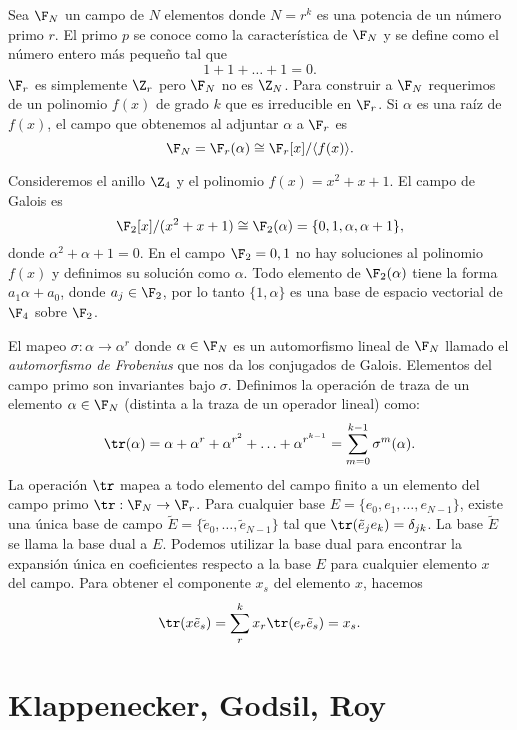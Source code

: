   Sea $\F_N$ un campo de $N$ elementos donde $N = r^{k}$ es
  una potencia de un número primo $r$. El primo $p$ se
  conoce como la característica de $\F_N$ y se define como
  el número entero más pequeño tal que
  \[
    1 + 1 + \ldots + 1 = 0.
  \] 
  $\F_r$ es simplemente $\Z_r$ pero $\F_N$ no es $\Z_N$.
  Para construir a $\F_N$ requerimos de un polinomio $f(x)$ 
  de grado $k$ que es irreducible en $\F_r$. Si $\alpha$ es
  una raíz de $f(x)$, el campo que obtenemos al adjuntar
  $\alpha$ a $\F_r$ es
  \[
    \F_N
    = \F_r(\alpha) \cong \F_r[x] / \langle f(x) \rangle.
  \] 
  \begin{example}
    Consideremos el anillo $\Z_4$ y el polinomio $f(x) = x^2
    + x + 1$. El campo de Galois es
    \[
      \F_2[x] / (x^2 + x + 1)
      \cong \F_2(\alpha)
      = \{0, 1, \alpha, \alpha + 1\},
    \] 
    donde $\alpha^2 + \alpha + 1 = 0$. En el campo $\F_2 =
    {0,1}$ no hay soluciones al polinomio $f(x)$ y definimos
    su solución como $\alpha$. Todo elemento de
    $\F_2(\alpha)$ tiene la forma $a_1 \alpha + a_0$, donde
    $a_j \in \F_2$, por lo tanto $\{1, \alpha\}$ es una base
    de espacio vectorial de $\F_4$ sobre $\F_2$.
  \end{example}

  El mapeo $\sigma : \alpha \to \alpha^r$ donde $\alpha \in
  \F_N$ es un automorfismo lineal de $\F_N$ llamado el
  \textit{automorfismo de Frobenius} que nos da los
  conjugados de Galois. Elementos del campo primo son
  invariantes bajo $\sigma$. Definimos la operación de traza
  de un elemento $\alpha \in \F_N$ (distinta a la traza de
  un operador lineal) como:
  \[
    \tr(\alpha) 
    = \alpha + \alpha^{r} + \alpha^{r^2} + \ldots +
    \alpha^{r^{k-1}}
    = \sum_{m=0}^{k-1} \sigma^{m}(\alpha).
  \] 
  La operación $\tr$ mapea a todo elemento del campo finito
  a un elemento del campo primo $\tr : \F_N \to \F_r$. Para
  cualquier base $E = \{e_0,e_1,\ldots,e_{N-1}\}$, existe
  una única base de campo $\tilde E = \{\tilde
  e_0,\ldots,\tilde e_{N-1}\}$ tal que $\tr(\tilde e_j e_k)
  = \delta_{jk}$. La base $\tilde E$ se llama la base dual a
  $E$. Podemos utilizar la base dual para encontrar la
  expansión única en coeficientes respecto a la base $E$ 
  para cualquier elemento $x$ del campo. Para obtener el
  componente $x_s$ del elemento $x$, hacemos
  \[
    \tr(x \tilde e_s)
    = \sum_{r}^{k} x_r \tr(e_r \tilde e_s)
    = x_s.
  \]

  \section{Klappenecker, Godsil, Roy}

